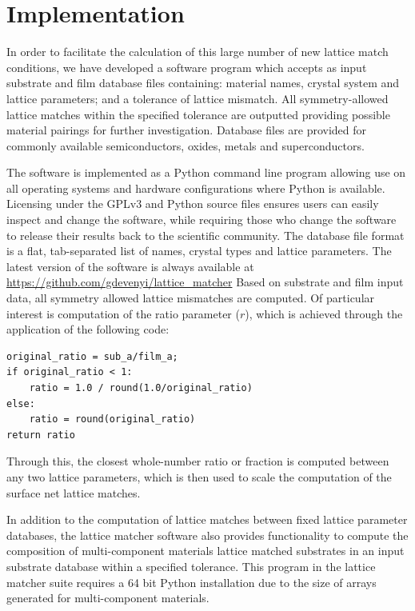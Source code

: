 \documentclass[final,5p,times,twocolumn]{elsarticle}
\begin{document}
\section{Implementation}
In order to facilitate the calculation of this large number of new lattice match conditions, we have developed a software program which accepts as input substrate and film database files containing: material names, crystal system and lattice parameters; and a tolerance of lattice mismatch. All symmetry-allowed lattice matches within the specified tolerance are outputted providing possible material pairings for further investigation. Database files are provided for commonly available semiconductors, oxides, metals and superconductors.

The software is implemented as a Python command line program allowing use on all operating systems and hardware configurations where Python is available. Licensing under the GPLv3 and Python source files ensures users can easily inspect and change the software, while requiring those who change the software to release their results back to the scientific community. The database file format is a flat, tab-separated list of names, crystal types and lattice parameters. The latest version of the software is always available at \url{https://github.com/gdevenyi/lattice_matcher} Based on substrate and film input data, all symmetry allowed lattice mismatches are computed. Of particular interest is computation of the ratio parameter ($r$), which is achieved through the application of the following code:
\begin{verbatim}
original_ratio = sub_a/film_a;
if original_ratio < 1:
    ratio = 1.0 / round(1.0/original_ratio)
else:
    ratio = round(original_ratio)
return ratio
\end{verbatim}
Through this, the closest whole-number ratio or fraction is computed between any two lattice parameters, which is then used to scale the computation of the surface net lattice matches.

In addition to the computation of lattice matches between fixed lattice parameter databases, the lattice matcher software also provides functionality to compute the composition of multi-component materials lattice matched substrates in an input substrate database within a specified tolerance. This program in the lattice matcher suite requires a 64 bit Python installation due to the size of arrays generated for multi-component materials.
\end{document}
